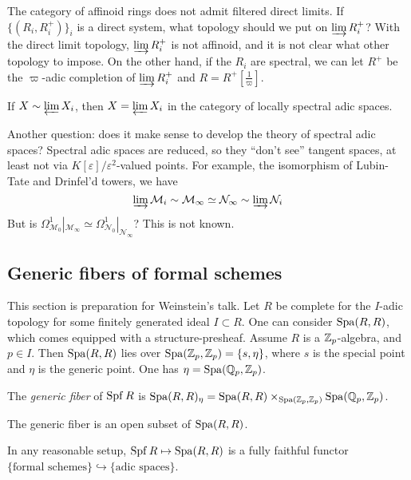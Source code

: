 The category of affinoid rings does not admit filtered direct limits. If 
$\{(R_i,R_i^+)\}_i$ is a direct system, what topology should we put on 
$\varinjlim R_i^+$? With the direct limit topology, $\varinjlim R_i^+$ is not 
affinoid, and it is not clear what other topology to impose. On the other hand, 
if the $R_i$ are spectral, we can let $R^+$ be the $\varpi$-adic completion of 
$\varinjlim R_i^+$ and $R=R^+[\frac 1 \varpi]$. 

\begin{proposition}
If $X\sim \varprojlim X_i$, then $X=\varprojlim X_i$ in the category of 
locally spectral adic spaces. 
\end{proposition}

Another question: does it make sense to develop the theory of spectral adic spaces? 
Spectral adic spaces are reduced, so they ``don't see'' tangent spaces, at least 
not via $K[\varepsilon]/\varepsilon^2$-valued points. For example, the isomorphism of 
Lubin-Tate and Drinfel'd towers, we have 
\[
  \varinjlim \mathcal M_i \sim \mathcal M_\infty\simeq \mathcal N_\infty \sim \varinjlim \mathcal N_i
\]
But is $\Omega_{\mathcal M_0}^1|_{\mathcal M_\infty}\simeq \Omega_{\mathcal N_0}^1|_{\mathcal N_\infty}$? This is not known. 





\subsection{Generic fibers of formal schemes}

This section is preparation for Weinstein's talk. Let $R$ be complete for the 
$I$-adic topology for some finitely generated ideal $I\subset R$. One can 
consider $\operatorname{Spa}(R,R)$, which comes equipped with a structure-presheaf. Assume 
$R$ is a $\mathbb{Z}_p$-algebra, and $p\in I$. Then $\operatorname{Spa}(R,R)$ lies over 
$\operatorname{Spa}(\mathbb{Z}_p,\mathbb{Z}_p) = \{s,\eta\}$, where $s$ is the special point and $\eta$ is 
the generic point. One has $\eta=\operatorname{Spa}(\mathbb{Q}_p,\mathbb{Z}_p)$. 

\begin{definition}
The \emph{generic fiber} of $\operatorname{Spf} R$ is $\operatorname{Spa}(R,R)_\eta = \operatorname{Spa}(R,R)\times_{\operatorname{Spa}(\mathbb{Z}_p,\mathbb{Z}_p)} \operatorname{Spa}(\mathbb{Q}_p,\mathbb{Z}_p)$. 
\end{definition}
The generic fiber is an open subset of $\operatorname{Spa}(R,R)$. 

In any reasonable setup, $\operatorname{Spf} R\mapsto \operatorname{Spa}(R,R)$ is a fully faithful functor 
$\{\text{formal schemes}\}\hookrightarrow \{\text{adic spaces}\}$. 

